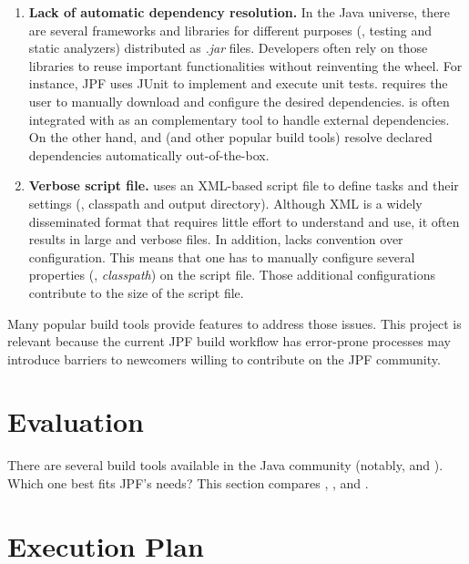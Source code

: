 \documentclass[a4paper, 12pt]{article}
\begin{document}
\begin{enumerate}

\item \textbf{Lack of automatic dependency resolution.}
In the Java universe, there are several frameworks and libraries for different
purposes (\eg, testing and static analyzers) distributed as \emph{.jar} files.
Developers often rely on those libraries to reuse important functionalities
without reinventing the wheel.
For instance, JPF uses JUnit to implement and execute unit tests.
\ant{} requires the user to manually download and configure the desired
dependencies.
\ant{} is often integrated with \ivy{}\cite{page:ivy} as an complementary
tool to handle external dependencies.
On the other hand, \gradle{} and \maven{} (and other popular build tools)
resolve declared dependencies automatically out-of-the-box.

\item \textbf{Verbose script file.}
\ant{} uses an XML-based script file to define tasks and their settings (\eg,
classpath and output directory).
Although XML is a widely disseminated format that requires little effort to
understand and use, it often results in large and verbose files.
In addition, \ant{} lacks convention over configuration.
This means that one has to manually configure several properties (\eg,
\emph{classpath}) on the script file.
Those additional configurations contribute to the size of the script file.

\end{enumerate}

Many popular build tools provide features to address those issues.
This project is relevant because the current JPF build workflow has error-prone
processes may introduce barriers to newcomers willing to contribute on the JPF
community.

\section{Evaluation}
\label{sec:evaluation}

There are several build tools available in the Java community (notably,
\maven{} and \gradle{}).
Which one best fits JPF's needs?
This section compares \maven{}, \gradle{}, and \sbt{}\cite{page:sbt}.



\section{Execution Plan}
\label{sec:plan}




\end{document}
